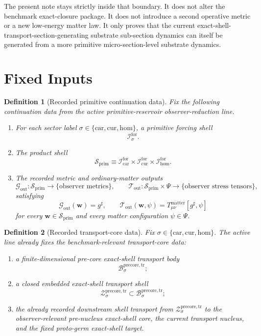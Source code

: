 \documentclass[11pt]{article}
\newcommand{\CompletedMetric}{g^{\sharp}}
\newcommand{\MatterSpace}{\Psi}
\newcommand{\Car}{\mathrm{car}}
\newcommand{\Cur}{\mathrm{cur}}
\newcommand{\Hom}{\mathrm{hom}}
\newcommand{\ForSpace}[1]{\mathcal I_{#1}^{\mathrm{for}}}
\newcommand{\PrimShell}{\mathcal S_{\mathrm{prim}}}
\newcommand{\MetricOut}{\mathscr G_{\mathrm{out}}}
\newcommand{\MatterOut}{\mathscr T_{\mathrm{out}}}
\newcommand{\PreCoreTrBody}[1]{\mathcal B_{#1}^{\mathrm{precore,tr}}}
\newcommand{\PreCoreTrShell}[1]{\mathcal Z_{#1}^{\mathrm{precore,tr}}}
\newtheorem{definition}{Definition}
\begin{document}
The present note stays strictly inside that boundary. It does not alter the benchmark exact-closure package. It does not introduce a second operative metric or a new low-energy matter law. It only proves that the current exact-shell-transport-section-generating substrate sub-section dynamics can itself be generated from a more primitive micro-section-level substrate dynamics.

\section{Fixed Inputs}

\begin{definition}[Recorded primitive continuation data]
\label{def:fixed}
Fix the following continuation data from the active primitive-reservoir observer-reduction line.
\begin{enumerate}
    \item For each sector label \(\sigma\in\{\Car,\Cur,\Hom\}\), a primitive forcing shell
    \[
    \ForSpace{\sigma}.
    \]
    \item The product shell
    \[
    \PrimShell
    \equiv
    \ForSpace{\Car}\times \ForSpace{\Cur}\times \ForSpace{\Hom}.
    \]
    \item The recorded metric and ordinary-matter outputs
    \[
    \MetricOut:\PrimShell\to\{\text{observer metrics}\},
    \qquad
    \MatterOut:\PrimShell\times\MatterSpace\to\{\text{observer stress tensors}\},
    \]
    satisfying
    \begin{equation}
    \MetricOut(\mathbf w)=\CompletedMetric,
    \qquad
    \MatterOut(\mathbf w,\psi)
    =
    T_{\mu\nu}^{\mathrm{matter}}[\CompletedMetric,\psi]
    \label{eq:fixedoutputs}
    \end{equation}
    for every \(\mathbf w\in\PrimShell\) and every matter configuration \(\psi\in\MatterSpace\).
\end{enumerate}
\end{definition}

\begin{definition}[Recorded transport-core data]
\label{def:transport}
Fix \(\sigma\in\{\Car,\Cur,\Hom\}\). The active line already fixes the benchmark-relevant transport-core data:
\begin{enumerate}
    \item a finite-dimensional pre-core exact-shell transport body
    \[
    \PreCoreTrBody{\sigma};
    \]
    \item a closed embedded exact-shell transport shell
    \[
    \PreCoreTrShell{\sigma}\subset\PreCoreTrBody{\sigma};
    \]
    \item the already recorded downstream shell transport from \(\PreCoreTrShell{\sigma}\) to the observer-relevant pre-nucleus exact-shell core, the current transport nucleus, and the fixed proto-germ exact-shell target.
\end{enumerate}
\end{definition}
\end{document}
